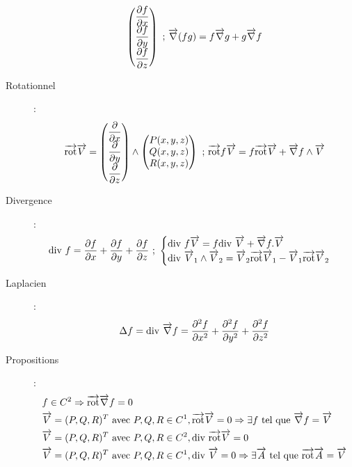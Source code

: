 \begin{description}
\[\begin{pmatrix}
            \dpartial{f}{x}\\
            \dpartial{f}{y}\\
            \dpartial{f}{z}\\
        \end{pmatrix}
        \textrm{ ; }
        \vect\nabla(fg)
        =f\vect\nabla g+g\vect\nabla f
    \]
\item[Rotationnel] :
    \[
        \rot\vect V=
        \begin{pmatrix}
            \dpartial{}{x}\\
            \dpartial{}{y}\\
            \dpartial{}{z}\\
        \end{pmatrix}
        \land
        \begin{pmatrix}
            P(x,y,z)\\
            Q(x,y,z)\\
            R(x,y,z)
        \end{pmatrix}
        \textrm{ ; }
        \rot f\vect V=f\rot\vect V+\grad f\land\vect V
    \]
\item[Divergence] :
    \[
        \divg f=\dpartial{f}{x}+\dpartial{f}{y}+\dpartial{f}{z}
        \textrm{ ; }
        \begin{cases}
            \divg f\vect V=f\divg\vect V+\grad f.\vect V\\
            \divg\vect V_1\land\vect V_2=\vect V_2\rot\vect V_1-\vect V_1\rot\vect V_2
        \end{cases}
    \]
\item[Laplacien] :
    \[
        \Delta f=\divg\grad f=
        \frac{\partial^2 f}{\partial x^2}+
        \frac{\partial^2 f}{\partial y^2}+
        \frac{\partial^2 f}{\partial z^2}
    \]
\item[Propositions] :
    \begin{align*}
        &f\in C^2\Rightarrow\rot\grad f=0\\
        &\vect V=(P,Q,R)^T\textrm{ avec }P,Q,R\in C^1, \rot\vect V=0\Rightarrow\exists f\tq\grad f=\vect V\\
        &\vect V=(P,Q,R)^T\textrm{ avec }P,Q,R\in C^2, \divg\rot\vect V=0\\
        &\vect V=(P,Q,R)^T\textrm{ avec }P,Q,R\in C^1, \divg\vect V=0\Rightarrow\exists\vect A\tq\rot\vect A=\vect V
    \end{align*}
\end{description}
